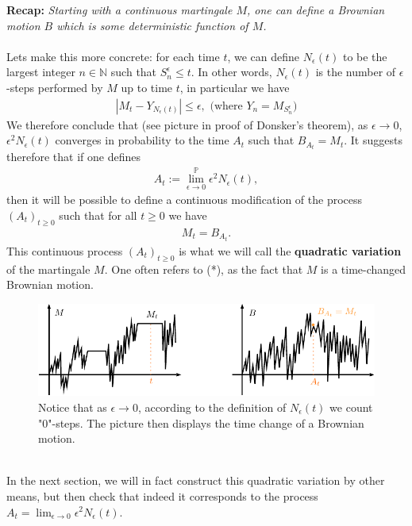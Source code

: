 \documentclass[../mainfile.tex]{subfiles}
\begin{document}
\newpage
\textbf{Recap:} \textit{Starting with a continuous martingale $M$, one can define a Brownian motion $B$ which is some deterministic function of $M$.}
\\\\
Lets make this more concrete: for each time $t$, we can define $N_\epsilon(t)$ to be the largest integer $n \in \mathbb{N}$ such that $S_n^\epsilon \leq t$. In other words, $N_\epsilon(t)$ is the number of $\epsilon$-steps performed by $M$ up to time $t$, in particular we have \begin{align*}
|M_t-Y_{N_\epsilon(t)}| \leq \epsilon, \text{ (where } Y_n=M_{S_n^\epsilon})
\end{align*}
We therefore conclude that (see picture in proof of Donsker's theorem), as $\epsilon \to 0$, $\epsilon^2 N_\epsilon(t)$ converges in probability to the time $A_t$ such that $B_{A_t}=M_t$. It suggests therefore that if one defines 
\begin{align*}
A_t:= \lim_{ \epsilon \to 0}^\mathbb{P} \epsilon^2 N_\epsilon(t),
\end{align*}
then it will be possible to define a continuous modification of the process $(A_t)_{t \geq 0}$ such that for all $t \geq 0$ we have \begin{align*}
M_t=B_{A_t}. \tag{*}
\end{align*}
This continuous process $(A_t)_{t \geq 0}$ is what we will call the \textbf{quadratic variation} of the martingale $M$. One often refers to (*), as the fact that $M$ is a time-changed Brownian motion. 
\begin{figure}[hbtp]
\centering
\includegraphics[scale=1]{quadvarproc.pdf}
\caption{Notice that as $\epsilon \to 0$, according to the definition of $N_\epsilon(t)$ we count "$0$"-steps. The picture then displays the time change of a Brownian motion.}
\end{figure}
\\
In the next section, we will in fact construct this quadratic variation by other means, but then check that indeed it corresponds to the process $A_t= \lim_{ \epsilon \to 0} \epsilon^2 N_\epsilon(t)$. 
\newpage
\end{document}
